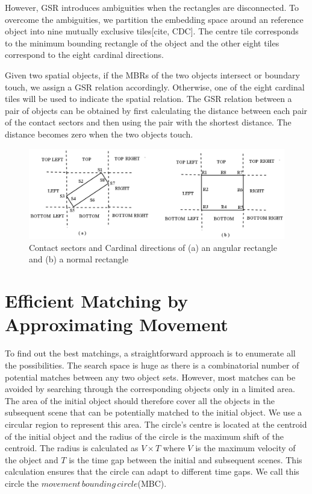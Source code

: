 \documentclass[letterpaper]{article}
\begin{document}
However, GSR introduces ambiguities when the rectangles are disconnected. To overcome the ambiguities, we partition the embedding space around an reference object into nine mutually exclusive tiles[cite, CDC]. The centre tile corresponds to the minimum bounding rectangle of the object and the other eight tiles correspond to the eight cardinal directions. 

Given two spatial objects, if the MBRs of the two objects intersect or boundary touch, we assign a GSR relation accordingly. Otherwise, one of the eight cardinal tiles will be used to indicate the spatial relation. The GSR relation between a pair of objects can be obtained by first calculating the distance between each pair of the contact sectors and then using the pair with the shortest distance. The distance becomes zero when the two objects touch. 

\begin{figure}[h!]
\centering\includegraphics[scale=0.25]{EGSR-relations.png}\caption{Contact sectors and Cardinal directions of (a) an angular rectangle and (b) a normal rectangle}
\end{figure}

\section{Efficient Matching by Approximating Movement}

To find out the best matchings, a straightforward approach is to enumerate all the possibilities. The search space is huge as there is a combinatorial number of potential matches between any two object sets. However, most matches can be avoided by searching through the corresponding objects only in a limited area. The area of the initial object should therefore cover all the objects in the subsequent scene that can be potentially matched to the initial object.  We use a circular region to represent this area. The circle's centre is located at the centroid of the initial object and the radius of the circle is the maximum shift of the centroid. The radius is calculated as $V \times T$ where $V$ is the maximum velocity of the object and $T$ is the time gap between the initial and subsequent scenes. This calculation ensures that the circle can adapt to different time gaps. We call this circle the $movement\,bounding\,circle$(MBC).  
\end{document}
